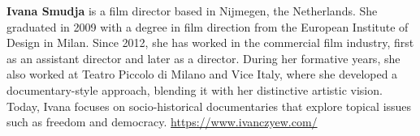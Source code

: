\documentclass[a4paper,
fontsize=11pt,
oneside,
numbers=noperiodatend,
parskip=half-,
bibliography=totoc,
final
]{scrartcl}
\begin{document}
\textbf{Ivana Smudja} is a film director based in Nijmegen, the Netherlands. She
graduated in 2009 with a degree in film direction from the European
Institute of Design in Milan. Since 2012, she has worked in the
commercial film industry, first as an assistant director and later as a
director. During her formative years, she also worked at Teatro Piccolo
di Milano and Vice Italy, where she developed a documentary-style
approach, blending it with her distinctive artistic vision. Today, Ivana
focuses on socio-historical documentaries that explore topical issues
such as freedom and democracy.\newline
\url{https://www.ivanczyew.com/}
\end{document}
